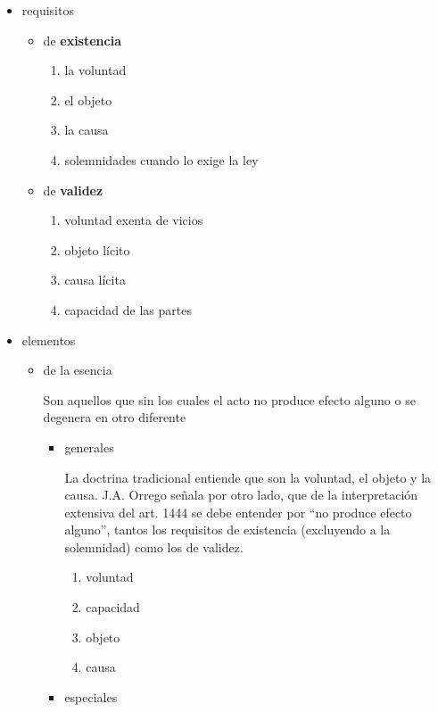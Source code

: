 \documentclass[]{article}
\providecommand{\tightlist}{%
  \setlength{\itemsep}{0pt}\setlength{\parskip}{0pt}}
\begin{document}
\begin{itemize}
\tightlist
\item
  requisitos

  \begin{itemize}
  \tightlist
  \item
    de \textbf{existencia}

    \begin{enumerate}
    \def\labelenumi{\arabic{enumi}.}
    \tightlist
    \item
      la voluntad
    \item
      el objeto
    \item
      la causa
    \item
      solemnidades cuando lo exige la ley
    \end{enumerate}
  \item
    de \textbf{validez}

    \begin{enumerate}
    \def\labelenumi{\arabic{enumi}.}
    \tightlist
    \item
      voluntad exenta de vicios
    \item
      objeto lícito
    \item
      causa lícita
    \item
      capacidad de las partes
    \end{enumerate}
  \end{itemize}
\item
  elementos

  \begin{itemize}
  \item
    de la esencia

    Son aquellos que sin los cuales el acto no produce efecto alguno o
    se degenera en otro diferente

    \begin{itemize}
    \item
      generales

      La doctrina tradicional entiende que son la voluntad, el objeto y
      la causa. J.A. Orrego señala por otro lado, que de la
      interpretación extensiva del art. 1444 se debe entender por ``no
      produce efecto alguno'', tantos los requisitos de existencia
      (excluyendo a la solemnidad) como los de validez.

      \begin{enumerate}
      \def\labelenumi{\arabic{enumi}.}
      \tightlist
      \item
        voluntad
      \item
        capacidad
      \item
        objeto
      \item
        causa
      \end{enumerate}
    \item
      especiales


\end{itemize}
\end{itemize}
\end{itemize}
\end{document}

